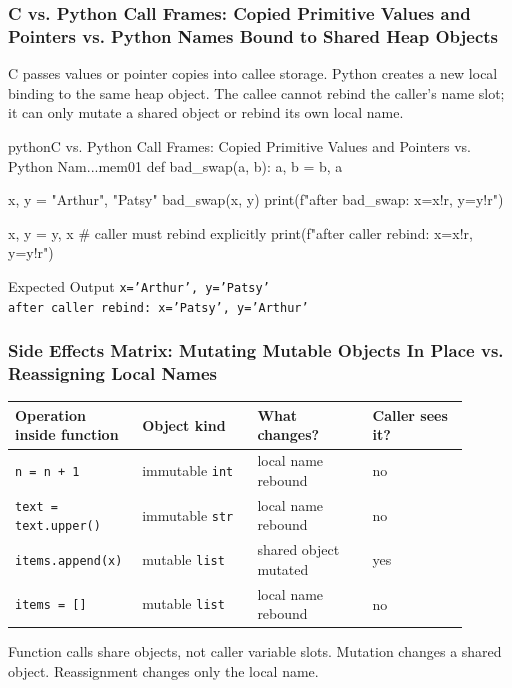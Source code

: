 \subsubsection{C vs. Python Call Frames: Copied Primitive Values and Pointers vs. Python Names Bound to Shared Heap Objects}

C passes values or pointer copies into callee storage. Python creates a new local binding to the same heap object. The callee cannot rebind the caller's name slot; it can only mutate a shared object or rebind its own local name.

\begin{codebox}[]{python}{C vs. Python Call Frames: Copied Primitive Values and Pointers vs. Python Nam...}{mem01}
def bad_swap(a, b):
    a, b = b, a

x, y = "Arthur", "Patsy"
bad_swap(x, y)
print(f"after bad_swap: x={x!r}, y={y!r}")

x, y = y, x  # caller must rebind explicitly
print(f"after caller rebind: x={x!r}, y={y!r}")
\end{codebox}


\begin{iobox}{Expected Output}
\texttt{x='Arthur', y='Patsy'} \\
\texttt{after caller rebind: x='Patsy', y='Arthur'} \\
\end{iobox}




\subsubsection{Side Effects Matrix: Mutating Mutable Objects In Place vs. Reassigning Local Names}

\begin{center}
\begin{tabular}{|p{0.22\linewidth}|p{0.24\linewidth}|p{0.24\linewidth}|p{0.20\linewidth}|}
\hline
\textbf{Operation inside function} & \textbf{Object kind} & \textbf{What changes?} & \textbf{Caller sees it?} \\
\hline
\texttt{n = n + 1} & immutable \texttt{int} & local name rebound & no \\
\hline
\texttt{text = text.upper()} & immutable \texttt{str} & local name rebound & no \\
\hline
\texttt{items.append(x)} & mutable \texttt{list} & shared object mutated & yes \\
\hline
\texttt{items = []} & mutable \texttt{list} & local name rebound & no \\
\hline
\end{tabular}
\end{center}

Function calls share objects, not caller variable slots. Mutation changes a shared object. Reassignment changes only the local name.
